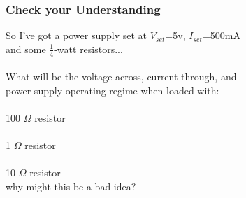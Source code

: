 \documentclass{beamer}
\begin{document}
\begin{frame}
\frametitle{Check your Understanding}
\centering
So I've got a power supply set at $V_{set}$=5v, $I_{set}$=500mA \\
and some $\tfrac{1}{4}$-watt resistors... \\
\hfill \\
What will be the voltage across, current through, and \\
power supply operating regime when loaded with: \\
\hfill \\
100 $\Omega$ resistor \\ %
\hfill \\
1 $\Omega$ resistor \\ %
\hfill \\
10 $\Omega$ resistor \\ %
\pause
\scriptsize{why might this be a bad idea?}
\end{frame}

\end{document}
